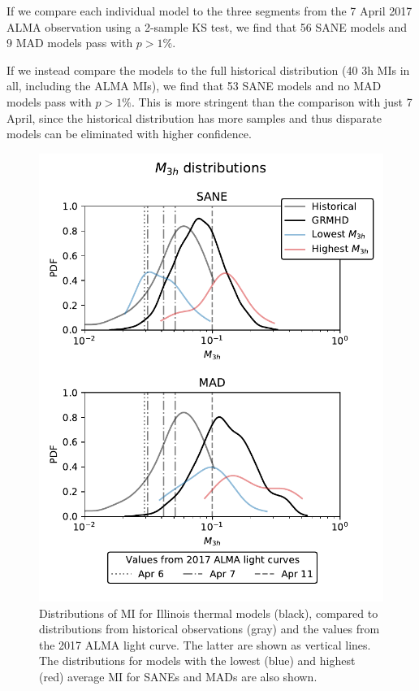 If we compare each individual model to the three segments from the 7 April 2017 ALMA observation using a 2-sample KS test, we find that 56 SANE models and 9 MAD models pass with $p > 1\%$. 

If we instead compare the models to the full historical distribution (40 3h MIs in all, including the ALMA MIs), we find that 53 SANE models and no MAD models pass with $p > 1\%$. This is more stringent than the comparison with just 7 April, since the historical distribution has more samples and thus disparate models can be eliminated with higher confidence. 


\begin{figure}
  \centering
  \includegraphics[width=\columnwidth]{./figures/mi_dist.pdf}
  \caption{Distributions of MI for Illinois thermal models (black), compared to distributions from historical observations (gray) and the values from the 2017 ALMA light curve. The latter are shown as vertical lines. The distributions for models with the lowest (blue) and highest (red) average MI for SANEs and MADs are also shown. }
  \label{fig:cmp_ALMA_var}
\end{figure}

